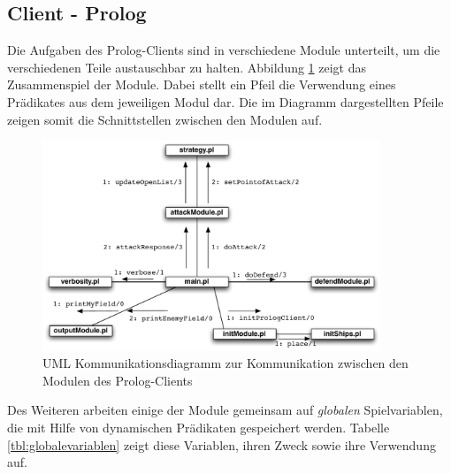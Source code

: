\subsection{Client - Prolog} \label{sec:Prologclient}
	Die Aufgaben des Prolog-Clients sind in verschiedene Module unterteilt, um die verschiedenen Teile austauschbar zu halten. 
	Abbildung \ref{fig:prologmodule} zeigt das Zusammenspiel der Module. Dabei stellt ein Pfeil die Verwendung eines Prädikates aus
	dem jeweiligen Modul dar. Die im Diagramm dargestellten Pfeile zeigen somit die Schnittstellen zwischen den Modulen auf.
	
	\begin{figure}[H] %
		\centering
		\includegraphics[width=0.9\textwidth]{images/ModuleCommunication.pdf}
		\caption{UML Kommunikationsdiagramm zur Kommunikation zwischen den Modulen des Prolog-Clients}
		\label{fig:prologmodule}
	\end{figure}

	Des Weiteren arbeiten einige der Module gemeinsam auf \textit{globalen} Spielvariablen, die mit Hilfe von dynamischen Prädikaten
	gespeichert werden. Tabelle \ref{tbl:globalevariablen} zeigt diese Variablen, ihren Zweck sowie ihre Verwendung auf.
	

